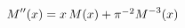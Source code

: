 $\mathop{M\/}\nolimits''\!\left(x\right)=x\mathop{M\/}\nolimits\!\left(x\right)%
+\pi^{-2}{\mathop{M\/}\nolimits^{-3}}\!\left(x\right)$